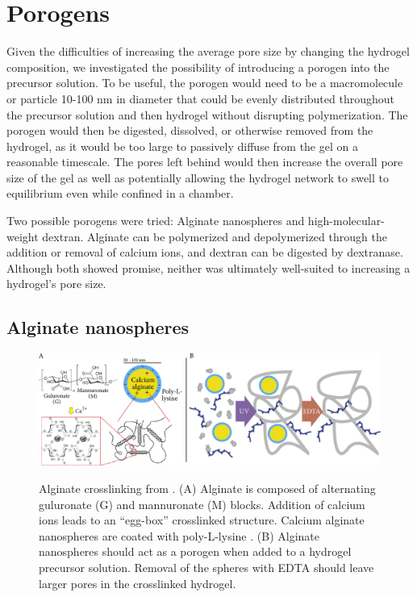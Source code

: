 \section{Porogens}

Given the difficulties of increasing the average pore size by changing the hydrogel composition, we investigated the possibility of introducing a porogen into the precursor solution.  To be useful, the porogen would need to be a macromolecule or particle 10-100 nm in diameter that could be evenly distributed throughout the precursor solution and then hydrogel without disrupting polymerization.  The porogen would then be digested, dissolved, or otherwise removed from the hydrogel, as it would be too large to passively diffuse from the gel on a reasonable timescale.  The pores left behind would then increase the overall pore size of the gel as well as potentially allowing the hydrogel network to swell to equilibrium even while confined in a chamber.

Two possible porogens were tried: Alginate nanospheres and high-molecular-weight dextran.  Alginate can be polymerized and depolymerized through the addition or removal of calcium ions, and dextran can be digested by dextranase.  Although both showed promise, neither was ultimately well-suited to increasing a hydrogel's pore size.

\subsection{Alginate nanospheres}
\begin{figure}
\caption{Alginate crosslinking from \cite{bruchet15}.  (A) Alginate is composed of alternating guluronate (G) and mannuronate (M) blocks.  Addition of calcium ions leads to an ``egg-box'' crosslinked structure. Calcium alginate nanospheres are coated with poly-L-lysine \cite{de03}.  (B) Alginate nanospheres should act as a porogen when added to a hydrogel precursor solution.  Removal of the spheres with EDTA should leave larger pores in the crosslinked hydrogel.}
\centering
\includegraphics[width=\textwidth]{figs/ch03/alginate-cartoon2}
\label{fig:alginate}
\end{figure}

